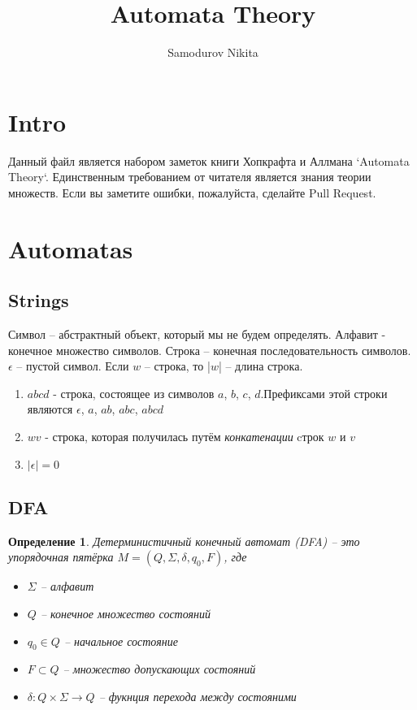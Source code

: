 \documentclass[5pt]{article}
\title{Automata Theory}
\author{Samodurov Nikita}
\newtheorem{definition}{Определение}
\begin{document}
\maketitle

\tableofcontents
\newpage

\section{Intro}

Данный файл является набором заметок книги Хопкрафта и Аллмана `Automata Theory`.
Единственным требованием от читателя является знания теории множеств.
Если вы заметите ошибки, пожалуйста, сделайте Pull Request.

\newpage
\section{Automatas}
\subsection{Strings}


Символ -- абстрактный объект, который мы не будем определять. Алфавит - конечное множество символов.
Строка -- конечная последовательность символов.
$\epsilon$ -- пустой символ.
Если $w$ -- строка, то |$w$| -- длина строка.

\begin{enumerate}
  \item $abcd$ - строка, состоящее из символов $a$, $b$, $c$, $d$.Префиксами этой строки являются $\epsilon$, $a$, $ab$, $abc$, $abcd$
  \item $wv$ - строка, которая получилась путём \textit{конкатенации} cтрок $w$ и $v$
  \item $|\epsilon| = 0$
\end{enumerate}

\subsection{DFA}

\begin{definition}
Детерминистичный конечный автомат (DFA) -- это упорядочная пятёрка
$M = (Q, \Sigma, \delta ,q_0, F)$, где

\begin{itemize}
  \item $\Sigma$ -- алфавит
  \item $Q$ -- конечное множество состояний
  \item $q_0 \in Q$ -- начальное состояние
  \item $F \subset Q$ -- множество допускающих состояний
  \item $\delta: Q \times \Sigma \rightarrow Q$ -- фукнция перехода между состояними
\end{itemize}
\end{definition}
\end{document}
